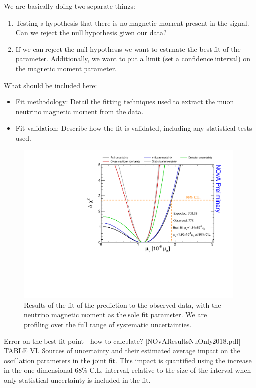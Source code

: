 We are basically doing two separate things:
\begin{enumerate}
\item Testing a hypothesis that there is no magnetic moment present in the signal. Can we reject the null hypothesis given our data?
\item If we can reject the null hypothesis we want to estimate the best fit of the parameter. Additionally, we want to put a limit (set a confidence interval) on the magnetic moment parameter.
\end{enumerate}

What should be included here:
\begin{itemize}
\item Fit methodology: Detail the fitting techniques used to extract the muon neutrino magnetic moment from the data.
\item Fit validation: Describe how the fit is validated, including any statistical tests used.
\end{itemize}

\begin{figure}[hbtp]
\centering
\includegraphics[width=\textwidth]{Plots/NuMM/NuMMLimit_FinalMoneyPlot.pdf}
\caption[Fit results]{Results of the fit of the prediction to the observed data, with the neutrino magnetic moment as the sole fit parameter. We are profiling over the full range of systematic uncertainties.}
\label{fig:NuMMResults}
\end{figure}

Error on the best fit point - how to calculate?
[NOvAResultsNuOnly2018.pdf] TABLE VI. Sources of uncertainty and their estimated average impact on the oscillation parameters in the joint fit. This impact is quantified using the increase in the one-dimensional 68\% C.L. interval, relative to the size of the interval when only statistical uncertainty is included in the fit. 

